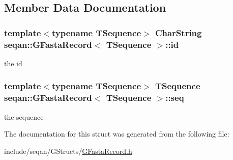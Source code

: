 \subsection{Member Data Documentation}
\hypertarget{structseqan_1_1_g_fasta_record_a9fc0e5fb39002e38b528f34906899941}{
\subsubsection[{id}]{\setlength{\rightskip}{0pt plus 5cm}template$<$typename T\-Sequence$>$ Char\-String {\bf seqan\-::\-G\-Fasta\-Record}$<$ T\-Sequence $>$\-::id}}\label{structseqan_1_1_g_fasta_record_a9fc0e5fb39002e38b528f34906899941}
the id \hypertarget{structseqan_1_1_g_fasta_record_a55a6d2deb7ef975f28a4aac89c779702}{
\subsubsection[{seq}]{\setlength{\rightskip}{0pt plus 5cm}template$<$typename T\-Sequence$>$ T\-Sequence {\bf seqan\-::\-G\-Fasta\-Record}$<$ T\-Sequence $>$\-::seq}}\label{structseqan_1_1_g_fasta_record_a55a6d2deb7ef975f28a4aac89c779702}
the sequence 

The documentation for this struct was generated from the following file\-:\begin{DoxyCompactItemize}
\item 
include/seqan/\-G\-Structs/\hyperlink{_g_fasta_record_8h}{G\-Fasta\-Record.\-h}\end{DoxyCompactItemize}
